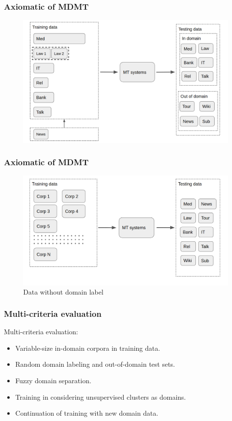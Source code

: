 \documentclass{beamer}
\begin{document}
\begin{frame}
\vspace{-0.2cm}
\frametitle{Axiomatic of MDMT}
\begin{figure}
\includegraphics[width=\textwidth]{mdmt.png}
\end{figure}
\end{frame}
\begin{frame}
\vspace{-0.2cm}
\frametitle{Axiomatic of MDMT}
\begin{figure}
\includegraphics[width=\textwidth]{unlabeled.png}
\caption{Data without domain label}
\end{figure}
\end{frame}

\begin{frame}
\frametitle{Multi-criteria evaluation}
Multi-criteria evaluation:
	\begin{itemize}
		\item<1-> Variable-size in-domain corpora in training data.
		\item<2-> Random domain labeling and out-of-domain test sets. 
		\item<3-> Fuzzy domain separation.
		\item<4-> Training in considering unsupervised clusters as domains.
		\item<5-> Continuation of training with new domain data.
	\end{itemize}
\end{frame}
\end{document}
